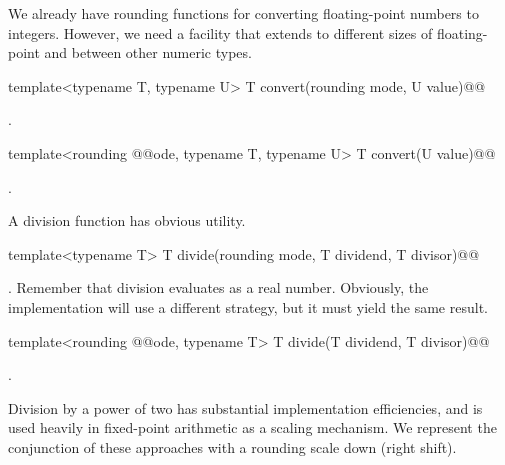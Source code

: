 \begin{addedblock}
We already have rounding functions for converting floating-point numbers to integers. However, we need a facility that extends to different sizes of floating-point and between other numeric types.

\begin{itemdecl}
template<typename T, typename U> T convert(rounding mode, U value)@\addmodif{;}@
\end{itemdecl}

\begin{itemdescr}
\returns {}.	
\end{itemdescr}

\begin{itemdecl}
template<rounding @@ode, typename T, typename U> T convert(U value)@\addmodif{;}@
\end{itemdecl}

\begin{itemdescr}
\returns {}.	
\end{itemdescr}

A division function has obvious utility.

\begin{itemdecl}
template<typename T> T divide(rounding mode, T dividend, T divisor)@\addmodif{;}@
\end{itemdecl}

\begin{itemdescr}
\returns {}. Remember that division evaluates as a real number. Obviously, the implementation will use a different strategy, but it must yield the same result.	
\end{itemdescr}

\begin{itemdecl}
template<rounding @@ode, typename T> T divide(T dividend, T divisor)@\addmodif{;}@
\end{itemdecl}

\begin{itemdescr}
\returns {}.	
\end{itemdescr}

Division by a power of two has substantial implementation efficiencies, and is used heavily in fixed-point arithmetic as a scaling mechanism. We represent the conjunction of these approaches with a rounding scale down (right shift).


\end{addedblock}

